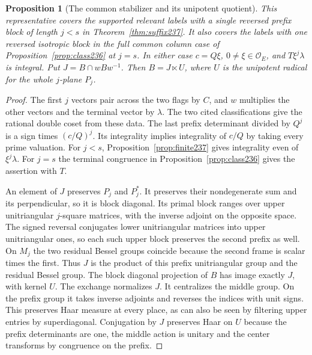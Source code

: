 \documentclass[a4paper,11pt]{article}
\newtheorem{proposition}{Proposition}[section]
\theoremstyle{definition}
\theoremstyle{remark}
\numberwithin{equation}{section}
\begin{document}
\begin{proposition}[The common stabilizer and its unipotent quotient]\leavevmode
\label{prop:block295}
This representative covers the supported relevant labels
with a single reversed prefix block of length \(j<s\)
in Theorem~\ref{thm:suffix237}. It also covers the labels
with one reversed isotropic block in the full common
column case of Proposition~\ref{prop:class236} at \(j=s\).
In either case \(c=Q\xi\), \(0\ne\xi\in\mathcal O_E\),
and \(T\xi^j\lambda\) is integral. Put \(J=B\cap wBw^{-1}\).
Then \(B=J\ltimes U\), where \(U\) is the unipotent
radical for the whole \(j\)-plane \(P_j\).
\end{proposition}
\begin{proof}
The first \(j\) vectors pair across the two flags by \(C\),
and \(w\) multiplies the other vectors and the terminal
vector by \(\lambda\). The two cited classifications give
the rational double coset from these data. The last prefix
determinant divided by \(Q^j\) is a sign times \((c/Q)^j\).
Its integrality implies integrality of \(c/Q\) by taking
every prime valuation. For \(j<s\),
Proposition~\ref{prop:finite237} gives integrality even
of \(\xi^j\lambda\). For \(j=s\) the terminal congruence
in Proposition~\ref{prop:class236} gives the assertion
with \(T\).

An element of \(J\) preserves \(P_j\) and \(P_j^*\).
It preserves their nondegenerate sum and its perpendicular,
so it is block diagonal. Its primal block ranges over
upper unitriangular \(j\)-square matrices, with the
inverse adjoint on the opposite space. The signed
reversal conjugates lower unitriangular matrices into
upper unitriangular ones, so each such upper block
preserves the second prefix as well. On \(M_j\) the
two residual Bessel groups coincide because the second
frame is scalar times the first. Thus \(J\) is the
product of this prefix unitriangular group and the
residual Bessel group. The block diagonal projection of
\(B\) has image exactly \(J\), with kernel \(U\).
The exchange normalizes \(J\). It centralizes the middle
group. On the prefix group it takes inverse adjoints
and reverses the indices with unit signs. This preserves
Haar measure at every place, as can also be seen by
filtering upper entries by superdiagonal. Conjugation
by \(J\) preserves Haar on \(U\) because the prefix
determinants are one, the middle action is unitary and
the center transforms by congruence on the prefix.


\end{proof}
\end{document}
